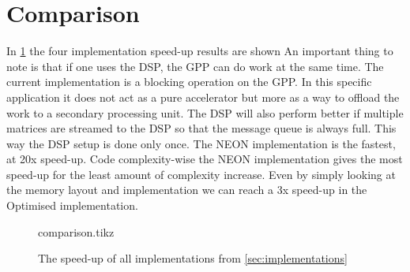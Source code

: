\documentclass[final]{article}
\begin{document}
\section{Comparison}
\label{sec:comparison}
In \cref{fig:comparison} the four implementation speed-up results are shown
An important thing to note is that if one uses the DSP, the GPP can do work at the same time.
The current implementation is a blocking operation on the GPP.
In this specific application it does not act as a pure accelerator but more as a way to offload the work to a secondary processing unit.
The DSP will also perform better if multiple matrices are streamed to the DSP so that the message queue is always full.
This way the DSP setup is done only once.
The NEON implementation is the fastest, at 20x speed-up. %
Code complexity-wise the NEON implementation gives the most speed-up for the least amount of complexity increase.
Even by simply looking at the memory layout and implementation we can reach a 3x speed-up in the Optimised implementation.

\begin{figure}
\centering
\setlength{}
\setlength{}
{comparison.tikz}
\caption{The speed-up of all implementations from \cref{sec:implementations}}
\label{fig:comparison}
\end{figure}
\end{document}
